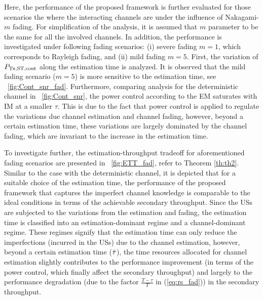 {Here, the performance of the proposed framework is further evaluated for those scenarios the where the interacting channels are under the influence of Nakagami-$m$ fading. For simplification of the analysis, it is assumed that $m$ parameter to be the same for all the involved channels. In addition, the performance is investigated under following fading scenarios: (i) severe fading $m=1$, which corresponds to Rayleigh fading, and (ii) mild fading $m = 5$. First, the variation of $P_{\text{Tx,ST,cont}}$ along the estimation time is analyzed. It is observed that the mild fading scenario ($m = 5$) is more sensitive to the estimation time, see \figurename~\ref{fig:Cont_snr_fad}. Furthermore, comparing analysis for the deterministic channel in \figurename~\ref{fig:Cont_snr}, the power control according to the EM saturates with IM at a smaller $\tau$. This is due to the fact that power control is applied to regulate the variations due channel estimation and channel fading, however, beyond a certain estimation time, these variations are largely dominated by the channel fading, which are invariant to the increase in the estimation time. 

To investigate further, the estimation-throughput tradeoff for aforementioned fading scenarios are presented in \figurename~\ref{fig:ETT_fad}, refer to Theorem \ref{th:th2}. Similar to the case with the deterministic channel, it is depicted that for a suitable choice of the estimation time, the performance of the proposed framework that captures the imperfect channel knowledge is comparable to the ideal conditions in terms of the achievable secondary throughput. Since the USs are subjected to the variations from the estimation and fading, the estimation time is classified into an estimation-dominant regime and a channel-dominant regime. These regimes signify that the estimation time can only reduce the imperfections (incurred in the USs) due to the channel estimation, however, beyond a certain estimation time ($\tilde{\tau}$), the time resources allocated for channel estimation slightly contributes to the performance improvement (in terms of the power control, which finally affect the secondary throughput) and largely to the performance degradation (due to the factor $\frac{T - \tau}{T}$ in (\ref{eq:rs_fad})) in the secondary throughput. 

}
